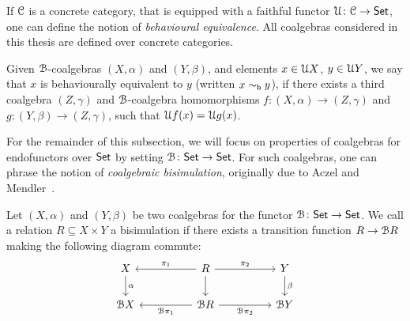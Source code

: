 If $\mathcal{C}$ is a concrete category, that is equipped with a faithful functor $\mathcal{U} \colon \mathcal{C} \to {\mathsf{Set}}$, one can define the notion of \emph{behavioural equivalence}. All coalgebras considered in this thesis are defined over concrete categories.
\begin{definition}\label{c2:def:behavioural_equivalence}
Given $\mathcal{B}$-coalgebras $(X, \alpha)$ and $(Y, \beta)$, and elements $x \in \mathcal{U} X$, $y \in \mathcal{U} Y$, we say that $x$ is behaviourally equivalent to $y$ (written $x \sim_{\mathsf{b}} y$), if there exists a third coalgebra $(Z, \gamma)$ and $\mathcal{B}$-coalgebra homomorphisms $f \colon (X, \alpha) \to (Z, \gamma)$ and $g \colon (Y, \beta) \to (Z, \gamma)$, such that $\mathcal{U} f(x)=\mathcal{U} g(x)$.	
\end{definition}


For the remainder of this subsection, we will focus on properties of coalgebras for endofunctors over ${\mathsf{Set}}$ by setting $\mathcal{B} \colon {\mathsf{Set}} \to {\mathsf{Set}}$. For such coalgebras, one can phrase the notion of \emph{coalgebraic bisimulation}, originally due to Aczel and Mendler~\cite{Aczel:1989:Final}.
\begin{definition}\label{c2:def:bisimulation}
Let $(X, \alpha)$ and $(Y, \beta)$ be two coalgebras for the functor $\mathcal{B} \colon {\mathsf{Set}} \to {\mathsf{Set}}$. We call a relation ${R} \subseteq {X \times Y}$ a bisimulation if there exists a transition function $R \to \mathcal{B} R$ making the following diagram commute:
\[\begin{tikzcd}
	X && R && Y \\
	{\funB X} && {\funB R} && {\funB Y}
	\arrow["\alpha", from=1-1, to=2-1]
	\arrow["{\pi_1}"', from=1-3, to=1-1]
	\arrow["{\pi_2}", from=1-3, to=1-5]
	\arrow[from=1-3, to=2-3]
	\arrow["\beta", from=1-5, to=2-5]
	\arrow["{\funB \pi_1}", from=2-3, to=2-1]
	\arrow["{\funB \pi_2}"', from=2-3, to=2-5]
\end{tikzcd}\]	
\end{definition}


